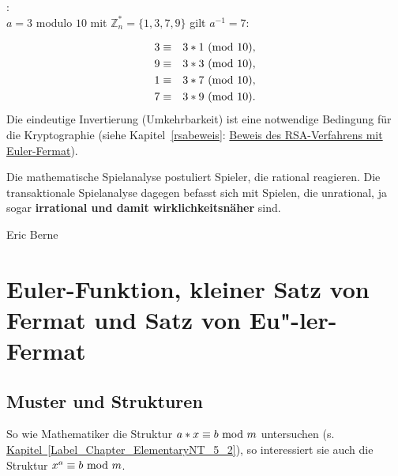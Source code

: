 \begin{refsegment}
\begin{example}{:}\\
$a = 3$ modulo $10$ mit $\mathbb{Z}_n^* = \{ 1, 3, 7, 9 \}$ gilt $a^{-1} = 7$:
\end{example}
\begin{eqnarray*}
3 & \equiv & 3 * 1{\rm ~(mod~}10), \nonumber\\
9 & \equiv & 3 * 3{\rm ~(mod~}10), \nonumber\\
1 & \equiv & 3 * 7{\rm ~(mod~}10), \nonumber\\
7 & \equiv & 3 * 9{\rm ~(mod~}10). \nonumber
\end{eqnarray*}
Die eindeutige Invertierung (Umkehrbarkeit) ist eine
notwendige Bedingung für die Kryptographie (siehe Kapitel~\ref{rsabeweis}:
\hyperlink{RSABeweis}{Beweis des RSA-Verfahrens mit Euler-Fermat}).




\pagebreak
\begin{ctsquote}
Die mathematische Spielanalyse postuliert Spieler, die rational reagieren.
Die transaktionale Spielanalyse dagegen befasst sich mit Spielen, die
unrational, ja sogar \textbf{irrational und damit wirklichkeitsnäher} sind.
\caption[Eric Berne]{Eric Berne\footnotemark}
\end{ctsquote}
\addtocounter{footnote}{0}

\hypertarget{Chapter_ElementaryNT_8}{}
\section[Euler-Funktion, kleiner Satz von Fermat und Satz von Euler-Fermat]
        {Euler-Funktion, kleiner Satz von Fermat und Satz von Eu"-ler-Fermat}

\hypertarget{patternsandstructures}{}
\subsection{Muster und Strukturen}
\label{patternsandstructures}
So wie Mathematiker die Struktur $a*x \equiv b {\rm ~mod~}m $ untersuchen
(s. \hyperlink{Chapter_ElementaryNT_5_2}
{Kapitel~\ref{Label_Chapter_ElementaryNT_5_2}}),
so interessiert sie auch die Struktur $ x^{a}\equiv b {\rm ~mod~}m$.


\end{refsegment}
